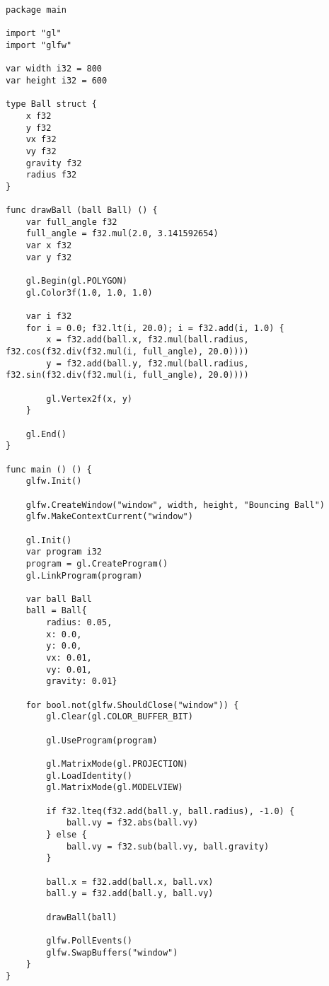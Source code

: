 \documentclass[11pt,fleqn,openany]{book} %
\begin{document}
\begin{lstlisting}[caption={Bouncing Ball Example},captionpos=b,label={listing:window-opengl}]
package main

import "gl"
import "glfw"

var width i32 = 800
var height i32 = 600

type Ball struct {
	x f32
	y f32
	vx f32
	vy f32
	gravity f32
	radius f32
}

func drawBall (ball Ball) () {
	var full_angle f32
	full_angle = f32.mul(2.0, 3.141592654)
	var x f32
	var y f32

	gl.Begin(gl.POLYGON)
	gl.Color3f(1.0, 1.0, 1.0)

	var i f32
	for i = 0.0; f32.lt(i, 20.0); i = f32.add(i, 1.0) {
		x = f32.add(ball.x, f32.mul(ball.radius, f32.cos(f32.div(f32.mul(i, full_angle), 20.0))))
		y = f32.add(ball.y, f32.mul(ball.radius, f32.sin(f32.div(f32.mul(i, full_angle), 20.0))))

		gl.Vertex2f(x, y)
	}

	gl.End()
}

func main () () {
	glfw.Init()

	glfw.CreateWindow("window", width, height, "Bouncing Ball")
	glfw.MakeContextCurrent("window")
	
	gl.Init()
	var program i32
	program = gl.CreateProgram()
	gl.LinkProgram(program)

	var ball Ball
	ball = Ball{
		radius: 0.05,
		x: 0.0,
		y: 0.0,
		vx: 0.01,
		vy: 0.01,
		gravity: 0.01}

	for bool.not(glfw.ShouldClose("window")) {
		gl.Clear(gl.COLOR_BUFFER_BIT)

		gl.UseProgram(program)
		
		gl.MatrixMode(gl.PROJECTION)
		gl.LoadIdentity()
		gl.MatrixMode(gl.MODELVIEW)

		if f32.lteq(f32.add(ball.y, ball.radius), -1.0) {
			ball.vy = f32.abs(ball.vy)
		} else {
			ball.vy = f32.sub(ball.vy, ball.gravity)
		}

		ball.x = f32.add(ball.x, ball.vx)
		ball.y = f32.add(ball.y, ball.vy)

		drawBall(ball)
		
		glfw.PollEvents()
		glfw.SwapBuffers("window")
	}
}
\end{lstlisting}

\end{document}
